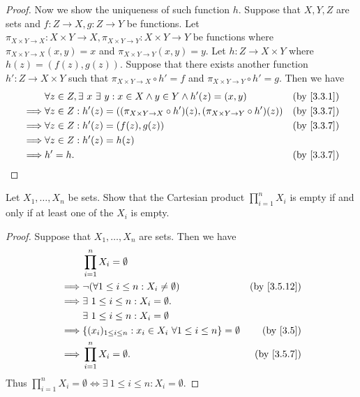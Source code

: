 \begin{proof}
  Now we show the uniqueness of such function \(h\).
  Suppose that \(X, Y, Z\) are sets and \(f : Z \to X, g : Z \to Y\) be functions.
  Let \(\pi_{X \times Y \to X} : X \times Y \to X, \pi_{X \times Y \to Y} : X \times Y \to Y\) be functions where \(\pi_{X \times Y \to X}(x, y) = x\) and \(\pi_{X \times Y \to Y}(x, y) = y\).
  Let \(h : Z \to X \times Y\) where \(h(z) = (f(z), g(z))\).
  Suppose that there exists another function \(h' : Z \to X \times Y\) such that \(\pi_{X \times Y \to X} \circ h' = f\) and \(\pi_{X \times Y \to Y} \circ h' = g\).
  Then we have
  \begin{align*}
             & \forall z \in Z, \exists\ x \ \exists\ y : x \in X \land y \in Y \land h'(z) = (x, y)                  & \text{(by \cref{3.3.1})} \\
    \implies & \forall z \in Z : h'(z) = ((\pi_{X \times Y \to X} \circ h')(z), (\pi_{X \times Y \to Y} \circ h')(z)) & \text{(by \cref{3.3.7})} \\
    \implies & \forall z \in Z : h'(z) = (f(z), g(z))                                                                 & \text{(by \cref{3.3.7})} \\
    \implies & \forall z \in Z : h'(z) = h(z)                                                                                                    \\
    \implies & h' = h.                                                                                                & \text{(by \cref{3.3.7})}
  \end{align*}
\end{proof}

\begin{exercise}\label{ex 3.5.8}
  Let \(X_1, \dots, X_n\) be sets.
  Show that the Cartesian product \(\prod_{i = 1}^n X_i\) is empty if and only if at least one of the \(X_i\) is empty.
\end{exercise}

\begin{proof}
  Suppose that \(X_1, \dots, X_n\) are sets.
  Then we have
  \begin{align*}
             & \prod_{i = 1}^n X_i = \emptyset                                                                             \\
    \implies & \lnot (\forall 1 \leq i \leq n : X_i \neq \emptyset)                            & \text{(by \cref{3.5.12})} \\
    \implies & \exists\ 1 \leq i \leq n : X_i = \emptyset.                                                                 \\
             & \exists\ 1 \leq i \leq n : X_i = \emptyset                                                                  \\
    \implies & \{(x_i)_{1 \leq i \leq n} : x_i \in X_i \ \forall 1 \leq i \leq n\} = \emptyset & \text{(by \cref{3.5})}    \\
    \implies & \prod_{i = 1}^n X_i = \emptyset.                                                & \text{(by \cref{3.5.7})}
  \end{align*}
  Thus \(\prod_{i = 1}^n X_i = \emptyset \iff \exists\ 1 \leq i \leq n : X_i = \emptyset\).
\end{proof}

